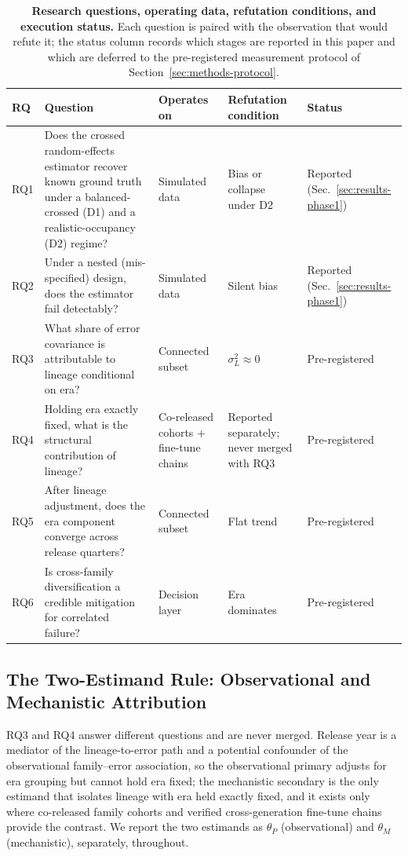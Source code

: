 \documentclass{ieeeaccess}
\theoremstyle{definition}
\theoremstyle{plain}
\begin{document}
\begin{table}[!t]
\caption{\textbf{Research questions, operating data, refutation conditions, and
execution status.} Each question is paired with the observation that would
refute it; the status column records which stages are reported in this paper
and which are deferred to the pre-registered measurement protocol of
Section~\ref{sec:methods-protocol}.}
\label{tab:rqs}
\setlength{\tabcolsep}{4pt}
\begin{tabular}{|p{24pt}|p{198pt}|p{76pt}|p{108pt}|p{52pt}|}
\hline
RQ & Question & Operates on & Refutation condition & Status \\
\hline
RQ1 & Does the crossed random-effects estimator recover known ground truth under a balanced-crossed (D1) and a realistic-occupancy (D2) regime? & Simulated data & Bias or collapse under D2 & Reported (Sec.~\ref{sec:results-phase1}) \\
RQ2 & Under a nested (mis-specified) design, does the estimator fail detectably? & Simulated data & Silent bias & Reported (Sec.~\ref{sec:results-phase1}) \\
RQ3 & What share of error covariance is attributable to lineage conditional on era? & Connected subset & $\sigma^{2}_{L}\approx0$ & Pre-registered \\
RQ4 & Holding era exactly fixed, what is the structural contribution of lineage? & Co-released cohorts + fine-tune chains & Reported separately; never merged with RQ3 & Pre-registered \\
RQ5 & After lineage adjustment, does the era component converge across release quarters? & Connected subset & Flat trend & Pre-registered \\
RQ6 & Is cross-family diversification a credible mitigation for correlated failure? & Decision layer & Era dominates & Pre-registered \\
\hline
\end{tabular}
\end{table}

\subsection{The Two-Estimand Rule: Observational and Mechanistic Attribution}
RQ3 and RQ4 answer different questions and are never merged. Release year is a
mediator of the lineage-to-error path and a potential confounder of the
observational family--error association, so the observational primary
adjusts for era grouping but cannot hold era fixed; the mechanistic secondary is the
only estimand that isolates lineage with era held exactly fixed, and it exists only
where co-released family cohorts and verified cross-generation fine-tune chains
provide the contrast. We report the two estimands as $\theta_{P}$ (observational)
and $\theta_{M}$ (mechanistic), separately, throughout.
\end{document}
